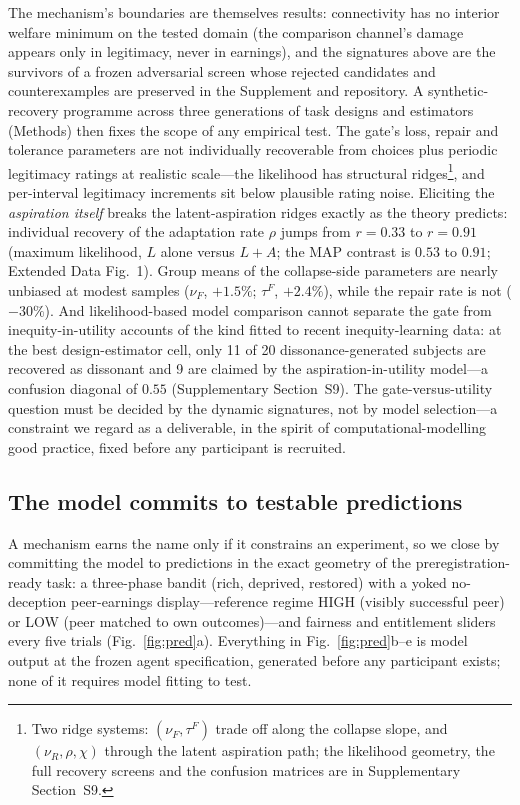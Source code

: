 \documentclass[11pt]{article}
\newcommand{\1}{\mathbf{1}}
\begin{document}
The mechanism's boundaries are themselves results: connectivity has no interior welfare minimum on the tested domain (the comparison channel's damage appears only in legitimacy, never in earnings), and the signatures above are the survivors of a frozen adversarial screen whose rejected candidates and counterexamples are preserved in the Supplement and repository. A synthetic-recovery programme across three generations of task designs and estimators (Methods) then fixes the scope of any empirical test. The gate's loss, repair and tolerance parameters are not individually recoverable from choices plus periodic legitimacy ratings at realistic scale---the likelihood has structural ridges\footnote{Two ridge systems: $(\nu_F,\tau^F)$ trade off along the collapse slope, and $(\nu_R,\rho,\chi)$ through the latent aspiration path; the likelihood geometry, the full recovery screens and the confusion matrices are in Supplementary Section~S9.}, and per-interval legitimacy increments sit below plausible rating noise. Eliciting the \emph{aspiration itself} breaks the latent-aspiration ridges exactly as the theory predicts: individual recovery of the adaptation rate $\rho$ jumps from $r=0.33$ to $r=0.91$ (maximum likelihood, $L$ alone versus $L{+}A$; the MAP contrast is $0.53$ to $0.91$; Extended Data Fig.~1). Group means of the collapse-side parameters are nearly unbiased at modest samples ($\nu_F$, $+1.5\%$; $\tau^F$, $+2.4\%$), while the repair rate is not ($-30\%$). And likelihood-based model comparison cannot separate the gate from inequity-in-utility accounts of the kind fitted to recent inequity-learning data\cite{HamJenkins2025}: at the best design-estimator cell, only 11 of 20 dissonance-generated subjects are recovered as dissonant and 9 are claimed by the aspiration-in-utility model---a confusion diagonal of $0.55$ (Supplementary Section~S9). The gate-versus-utility question must be decided by the dynamic signatures, not by model selection---a constraint we regard as a deliverable, in the spirit of computational-modelling good practice\cite{WilsonCollins2019}, fixed before any participant is recruited.

\subsection{The model commits to testable predictions}

A mechanism earns the name only if it constrains an experiment, so we close by committing the model to predictions in the exact geometry of the preregistration-ready task: a three-phase bandit (rich, deprived, restored) with a yoked no-deception peer-earnings display---reference regime HIGH (visibly successful peer) or LOW (peer matched to own outcomes)---and fairness and entitlement sliders every five trials (Fig.~\ref{fig:pred}a). Everything in Fig.~\ref{fig:pred}b--e is model output at the frozen agent specification, generated before any participant exists; none of it requires model fitting to test.
\end{document}
